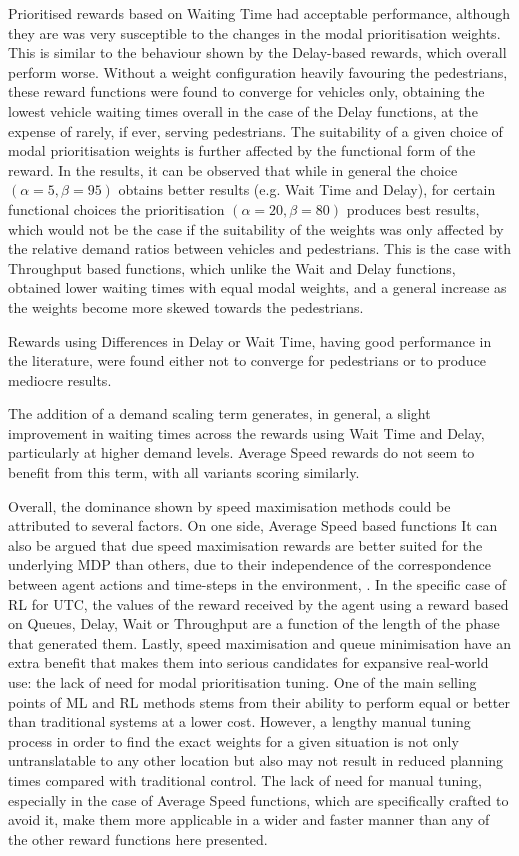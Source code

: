 \documentclass[conference]{IEEEtran}
\begin{document}
Prioritised rewards based on Waiting Time had acceptable performance, although they are was very susceptible to the changes in the modal prioritisation weights. 
This is similar to the behaviour shown by the Delay-based rewards, which overall perform worse.
Without a weight configuration heavily favouring the pedestrians, these reward functions were found to converge for vehicles only, obtaining the lowest vehicle waiting times overall in the case of the Delay functions, at the expense of rarely, if ever, serving pedestrians.
The suitability of a given choice of modal prioritisation weights is further affected by the functional form of the reward.
In the results, it can be observed that while in general the choice $(\alpha=5,\beta=95)$ obtains better results (e.g. Wait Time and Delay), for certain functional choices the prioritisation $(\alpha=20,\beta=80)$ produces best results, which would not be the case if the suitability of the weights was only affected by the relative demand ratios between vehicles and pedestrians. 
This is the case with Throughput based functions, which unlike the Wait and Delay functions, obtained lower waiting times with equal modal weights, and a general increase as the weights become more skewed towards the pedestrians.

Rewards using Differences in Delay or Wait Time, having good performance in the literature, were found either not to converge for pedestrians or to produce mediocre results.

The addition of a demand scaling term generates, in general, a slight improvement in waiting times across the rewards using Wait Time and Delay, particularly at higher demand levels. 
Average Speed rewards do not seem to benefit from this term, with all variants scoring similarly.

Overall, the dominance shown by speed maximisation methods could be attributed to several factors.
On one side, Average Speed based functions 
It can also be argued that due speed maximisation rewards are better suited for the underlying MDP than others, due to their independence of the correspondence between agent actions and time-steps in the environment, . In the specific case of RL for UTC, the values of the reward received by the agent using a reward based on Queues, Delay, Wait or Throughput are a function of the length of the phase that generated them.
Lastly, speed maximisation and queue minimisation have an extra benefit that makes them into serious candidates for expansive real-world use: the lack of need for modal prioritisation tuning.
One of the main selling points of ML and RL methods stems from their ability to perform equal or better than traditional systems at a lower cost.
However, a lengthy manual tuning process in order to find the exact weights for a given situation is not only untranslatable to any other location but also may not result in reduced planning times compared with traditional control.
The lack of need for manual tuning, especially in the case of Average Speed functions, which are specifically crafted to avoid it, make them more applicable in a wider and faster manner than any of the other reward functions here presented.
\end{document}

